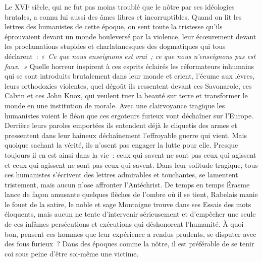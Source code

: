 \documentclass[french,twoside]{book} %
\begin{document}
Le XVIᵉ siècle, qui ne fut pas moins troublé que le nôtre par ses idéologies brutales, a connu lui aussi des âmes libres et incorruptibles. Quand on lit les lettres des humanistes de cette époque, on sent toute la tristesse qu’ils éprouvaient devant un monde bouleversé par la violence, leur écœurement devant les proclamations stupides et charlatanesques des dogmatiques qui tous déclarent : \emph{« Ce que nous enseignons est vrai ; ce que nous n’enseignons pas est faux. »} Quelle horreur inspirent à ces esprits éclairés les réformateurs inhumains qui se sont introduits brutalement dans leur monde et crient, l’écume aux lèvres, leurs orthodoxies violentes, quel dégoût ils ressentent devant ces Savonarole, ces Calvin et ces John Knox, qui veulent tuer la beauté sur terre et transformer le monde en une institution de morale. Avec une clairvoyance tragique les humanistes voient le fléau que ces ergoteurs furieux vont déchaîner sur l’Europe. Derrière leurs paroles emportées ils entendent déjà le cliquetis des armes et pressentent dans leur haineux déchaînement l’effroyable guerre qui vient. Mais quoique sachant la vérité, ils n’osent pas engager la lutte pour elle. Presque toujours il en est ainsi dans la vie : ceux qui savent ne sont pas ceux qui agissent et ceux qui agissent ne sont pas ceux qui savent. Dans leur solitude tragique, tous ces humanistes s’écrivent des lettres admirables et touchantes, se lamentent tristement, mais aucun n’ose affronter l’Antéchrist. De temps en temps Érasme lance de façon amusante quelques flèches de l’ombre où il se tient, Rabelais manie le fouet de la satire, le noble et sage Montaigne trouve dans ses Essais des mots éloquents, mais aucun ne tente d’intervenir sérieusement et d’empêcher une seule de ces infâmes persécutions et exécutions qui déshonorent l’humanité. À quoi bon, pensent ces hommes que leur expérience a rendus prudents, se disputer avec des fous furieux ? Dans des époques comme la nôtre, il est préférable de se tenir coi sous peine d’être soi-même une victime.\par
\end{document}
